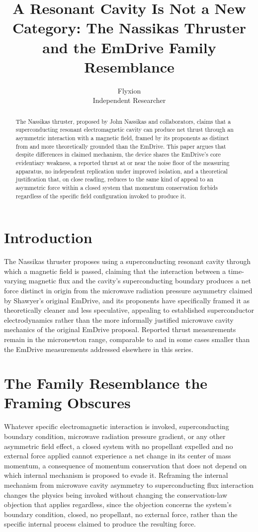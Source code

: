 \documentclass[11pt]{article}
\title{A Resonant Cavity Is Not a New Category: The Nassikas Thruster and the EmDrive Family Resemblance}
\author{Flyxion \\ \small Independent Researcher}
\date{}
\begin{document}
\maketitle

\begin{abstract}
The Nassikas thruster, proposed by John Nassikas and collaborators, claims that a superconducting resonant electromagnetic cavity can produce net thrust through an asymmetric interaction with a magnetic field, framed by its proponents as distinct from and more theoretically grounded than the EmDrive. This paper argues that despite differences in claimed mechanism, the device shares the EmDrive's core evidentiary weakness, a reported thrust at or near the noise floor of the measuring apparatus, no independent replication under improved isolation, and a theoretical justification that, on close reading, reduces to the same kind of appeal to an asymmetric force within a closed system that momentum conservation forbids regardless of the specific field configuration invoked to produce it.
\end{abstract}

\section{Introduction}

The Nassikas thruster proposes using a superconducting resonant cavity through which a magnetic field is passed, claiming that the interaction between a time-varying magnetic flux and the cavity's superconducting boundary produces a net force distinct in origin from the microwave radiation pressure asymmetry claimed by Shawyer's original EmDrive, and its proponents have specifically framed it as theoretically cleaner and less speculative, appealing to established superconductor electrodynamics rather than the more informally justified microwave cavity mechanics of the original EmDrive proposal. Reported thrust measurements remain in the micronewton range, comparable to and in some cases smaller than the EmDrive measurements addressed elsewhere in this series.

\section{The Family Resemblance the Framing Obscures}

Whatever specific electromagnetic interaction is invoked, superconducting boundary condition, microwave radiation pressure gradient, or any other asymmetric field effect, a closed system with no propellant expelled and no external force applied cannot experience a net change in its center of mass momentum, a consequence of momentum conservation that does not depend on which internal mechanism is proposed to evade it. Reframing the internal mechanism from microwave cavity asymmetry to superconducting flux interaction changes the physics being invoked without changing the conservation-law objection that applies regardless, since the objection concerns the system's boundary condition, closed, no propellant, no external force, rather than the specific internal process claimed to produce the resulting force.
\end{document}
